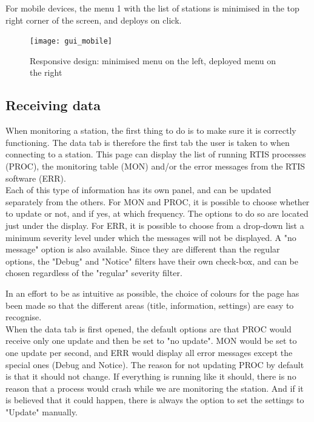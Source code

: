 \documentclass{themeensg}
\begin{document}
For mobile devices, the menu 1 with the list of stations is minimised in the top right corner of the screen, and deploys on click.\\

\begin{figure}[ht]
	\centering
	\texttt{[image: gui\_mobile]}
	\caption{Responsive design: minimised menu on the left, deployed menu on the right}
\end{figure}


\subsection{Receiving data}

When monitoring a station, the first thing to do is to make sure it is correctly functioning. The data tab is therefore the first tab the user is taken to when connecting to a station. This page can display the list of running RTIS processes (PROC), the monitoring table (MON) and/or the error messages from the RTIS software (ERR).\\
Each of this type of information has its own panel, and can be updated separately from the others. For MON and PROC, it is possible to choose whether to update or not, and if yes, at which frequency. The options to do so are located just under the display.
For ERR, it is possible to choose from a drop-down list a minimum severity level under which the messages will not be displayed. A "no message" option is also available. Since they are different than the regular options, the "Debug" and "Notice" filters have their own check-box, and can be chosen regardless of the "regular" severity filter.

In an effort to be as intuitive as possible, the choice of colours for the page has been made so that the different areas (title, information, settings) are easy to recognise. \\

When the data tab is first opened, the default options are that PROC would receive only one update and then be set to "no update". MON would be set to one update per second, and ERR would display all error messages except the special ones (Debug and Notice). The reason for not updating PROC by default is that it should not change. If everything is running like it should, there is no reason that a process would crash while we are monitoring the station. And if it is believed that it could happen, there is always the option to set the settings to "Update" manually.\\
\end{document}
